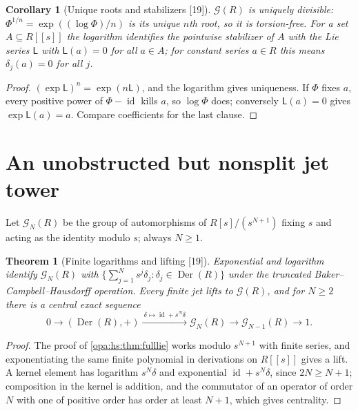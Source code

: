 \documentclass[11pt,oneside]{article}
\numberwithin{equation}{section}
\newtheorem{theorem}{Theorem}[section]
\newtheorem{corollary}[corollary]{Corollary}
\theoremstyle{definition}
\theoremstyle{remark}
\newcommand{\id}{\operatorname{id}}
\newcommand{\src}[1]{\textup{\textsf{\small[#1]}}}
\newcommand{\Der}{\operatorname{Der}}
\begin{document}
\begin{corollary}[Unique roots and stabilizers \src{19}]\label{opa:hs:cor:roots}
$\mathcal G(R)$ is uniquely divisible: $\Phi^{1/n}=\exp((\log\Phi)/n)$ is its unique $n$th root, so it is torsion-free. For a set $A\subseteq R[[s]]$ the
logarithm identifies the pointwise stabilizer of $A$ with the Lie series $\mathsf L$ with $\mathsf L(a)=0$ for all $a\in A$; for constant series $a\in R$ this
means $\delta_j(a)=0$ for all $j$.
\end{corollary}
\begin{proof}
$(\exp\mathsf L)^n=\exp(n\mathsf L)$, and the logarithm gives uniqueness. If $\Phi$ fixes $a$, every positive power of $\Phi-\id$ kills $a$, so $\log\Phi$ does;
conversely $\mathsf L(a)=0$ gives $\exp\mathsf L(a)=a$. Compare coefficients for the last clause.
\end{proof}

\section{An unobstructed but nonsplit jet tower}\label{opa:hs:sec:jets}

Let $\mathcal G_N(R)$ be the group of automorphisms of $R[s]/(s^{N+1})$ fixing $s$ and acting as the identity modulo $s$; always $N\ge1$.

\begin{theorem}[Finite logarithms and lifting \src{19}]\label{opa:hs:thm:jetlift}
Exponential and logarithm identify $\mathcal G_N(R)$ with $\{\sum_{j=1}^Ns^j\delta_j:\delta_j\in\Der(R)\}$ under the truncated
Baker--Campbell--Hausdorff operation. Every finite jet lifts to $\mathcal G(R)$, and for $N\ge2$ there is a central exact sequence
\begin{equation}\label{opa:hs:eq:jetexact}
 0\longrightarrow(\Der(R),+)\xrightarrow{\ \delta\mapsto\id+s^N\delta\ }\mathcal G_N(R)\longrightarrow\mathcal G_{N-1}(R)\longrightarrow1 .
\end{equation}
\end{theorem}
\begin{proof}
The proof of \cref{opa:hs:thm:fulllie} works modulo $s^{N+1}$ with finite series, and exponentiating the same finite polynomial in derivations on
$R[[s]]$ gives a lift. A kernel element has logarithm $s^N\delta$ and exponential $\id+s^N\delta$, since $2N\ge N+1$; composition in the kernel is
addition, and the commutator of an operator of order $N$ with one of positive order has order at least $N+1$, which gives centrality.
\end{proof}
\end{document}
